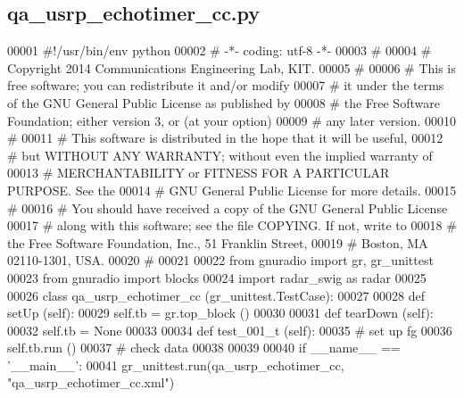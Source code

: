 \subsection{qa\+\_\+usrp\+\_\+echotimer\+\_\+cc.\+py}
\label{qa__usrp__echotimer__cc_8py_source}

\begin{DoxyCode}
00001 \textcolor{comment}{#!/usr/bin/env python}
00002 \textcolor{comment}{# -*- coding: utf-8 -*-}
00003 \textcolor{comment}{# }
00004 \textcolor{comment}{# Copyright 2014 Communications Engineering Lab, KIT.}
00005 \textcolor{comment}{# }
00006 \textcolor{comment}{# This is free software; you can redistribute it and/or modify}
00007 \textcolor{comment}{# it under the terms of the GNU General Public License as published by}
00008 \textcolor{comment}{# the Free Software Foundation; either version 3, or (at your option)}
00009 \textcolor{comment}{# any later version.}
00010 \textcolor{comment}{# }
00011 \textcolor{comment}{# This software is distributed in the hope that it will be useful,}
00012 \textcolor{comment}{# but WITHOUT ANY WARRANTY; without even the implied warranty of}
00013 \textcolor{comment}{# MERCHANTABILITY or FITNESS FOR A PARTICULAR PURPOSE.  See the}
00014 \textcolor{comment}{# GNU General Public License for more details.}
00015 \textcolor{comment}{# }
00016 \textcolor{comment}{# You should have received a copy of the GNU General Public License}
00017 \textcolor{comment}{# along with this software; see the file COPYING.  If not, write to}
00018 \textcolor{comment}{# the Free Software Foundation, Inc., 51 Franklin Street,}
00019 \textcolor{comment}{# Boston, MA 02110-1301, USA.}
00020 \textcolor{comment}{# }
00021 
00022 \textcolor{keyword}{from} gnuradio \textcolor{keyword}{import} gr, gr\_unittest
00023 \textcolor{keyword}{from} gnuradio \textcolor{keyword}{import} blocks
00024 \textcolor{keyword}{import} radar\_swig \textcolor{keyword}{as} radar
00025 
00026 \textcolor{keyword}{class }qa_usrp_echotimer_cc (gr\_unittest.TestCase):
00027 
00028     \textcolor{keyword}{def }setUp (self):
00029         self.tb = gr.top\_block ()
00030 
00031     \textcolor{keyword}{def }tearDown (self):
00032         self.tb = \textcolor{keywordtype}{None}
00033 
00034     \textcolor{keyword}{def }test_001_t (self):
00035         \textcolor{comment}{# set up fg}
00036         self.tb.run ()
00037         \textcolor{comment}{# check data}
00038 
00039 
00040 \textcolor{keywordflow}{if} \_\_name\_\_ == \textcolor{stringliteral}{'\_\_main\_\_'}:
00041     gr\_unittest.run(qa\_usrp\_echotimer\_cc, \textcolor{stringliteral}{"qa\_usrp\_echotimer\_cc.xml"})
\end{DoxyCode}
